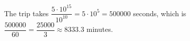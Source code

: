 The trip takes $\dfrac{5\cdot10^{15}}{10^{10}}=5\cdot10^5=500000$ seconds, which is $\dfrac{500000}{60}=\boxed{\dfrac{25000}{3}}\approx8333.3$ minutes.
